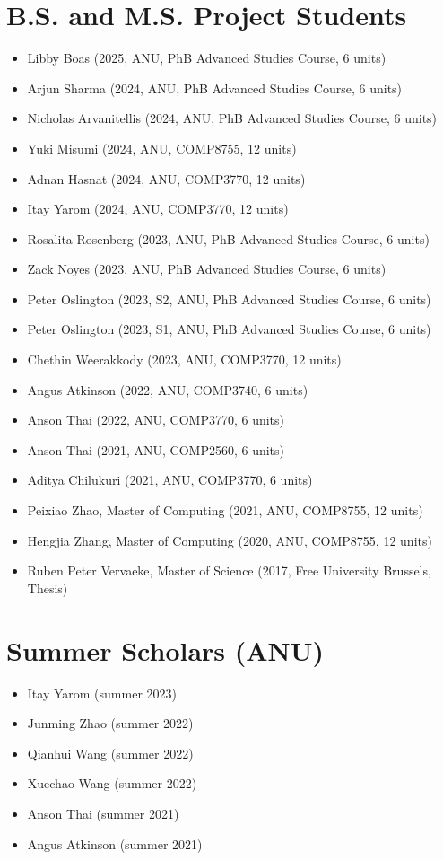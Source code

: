 \documentclass[11pt,a4paper,sans]{moderncv}
\begin{document}
\section{B.S. and M.S. Project Students}
{\small
\begin{itemize}
\item Libby Boas (2025, ANU, PhB Advanced Studies Course, 6 units)
\item Arjun Sharma (2024, ANU, PhB Advanced Studies Course, 6 units)
\item Nicholas Arvanitellis (2024, ANU, PhB Advanced Studies Course, 6 units)
\item Yuki Misumi (2024, ANU, COMP8755, 12 units)
\item Adnan Hasnat (2024, ANU, COMP3770, 12 units)
\item Itay Yarom (2024, ANU, COMP3770, 12 units)
\item Rosalita Rosenberg (2023, ANU, PhB Advanced Studies Course, 6 units)
\item Zack Noyes (2023, ANU, PhB Advanced Studies Course, 6 units)
\item Peter Oslington (2023, S2, ANU, PhB Advanced Studies Course, 6 units)
\item Peter Oslington (2023, S1, ANU, PhB Advanced Studies Course, 6 units)
\item Chethin Weerakkody (2023, ANU, COMP3770, 12 units)
\item Angus Atkinson (2022, ANU, COMP3740, 6 units)
\item Anson Thai (2022, ANU, COMP3770, 6 units)
\item Anson Thai (2021, ANU, COMP2560, 6 units)
\item Aditya Chilukuri (2021, ANU, COMP3770, 6 units)
\item Peixiao Zhao, Master of Computing (2021, ANU, COMP8755, 12 units)
\item Hengjia Zhang, Master of Computing (2020, ANU, COMP8755, 12 units)
\item Ruben Peter Vervaeke, Master of Science (2017, Free University Brussels, Thesis)
\end{itemize}
}

\section{Summer Scholars (ANU)}
{\small
\begin{itemize}
\item Itay Yarom (summer 2023)
\item Junming Zhao (summer 2022)
\item Qianhui Wang (summer 2022)
\item Xuechao Wang (summer 2022)
\item Anson Thai (summer 2021)
\item Angus Atkinson (summer 2021)
\end{itemize}
}
\end{document}
